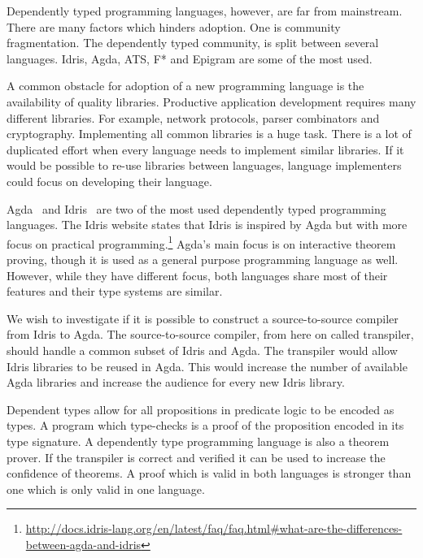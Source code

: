 \documentclass[parskip=half]{scrartcl}
\begin{document}
Dependently typed programming languages, however, are far from mainstream.
There are many factors which hinders adoption. One is community fragmentation.
The dependently typed community, is split between several languages.
Idris, Agda, ATS, F* and Epigram are some of the most used.

A common obstacle for adoption of a new programming language is the
availability of quality libraries. Productive application development requires
many different libraries.  For example, network protocols, parser combinators
and cryptography.  Implementing all common libraries is a huge task.  There is
a lot of duplicated effort when every language needs to implement similar
libraries.  If it would be possible to re-use libraries between languages,
language implementers could focus on developing their language.

Agda~\cite{agda} and Idris~\cite{idris} are two of the most used dependently
typed programming languages.
The Idris website states that Idris is inspired
by Agda but with more focus on practical
programming.\footnote{\url{http://docs.idris-lang.org/en/latest/faq/faq.html\#what-are-the-differences-between-agda-and-idris}}
Agda's main focus is on interactive theorem proving, though it is used as
a general purpose programming language as well.
However, while they have different focus, both languages share most of their features and their type systems are similar.

We wish to investigate if it is possible to construct a source-to-source
compiler from Idris to Agda. The source-to-source compiler, from here on called
transpiler, should handle a common subset of Idris and Agda.  The transpiler
would allow Idris libraries to be reused in Agda. This would increase the
number of available Agda libraries and increase the audience for every new
Idris library.

Dependent types allow for all propositions in predicate logic to be encoded as
types. A program which type-checks is a proof of the proposition encoded in
its type signature. A dependently type programming language is also a theorem
prover. If the transpiler is correct and verified it can be used to increase
the confidence of theorems. A proof which is valid in both languages is
stronger than one which is only valid in one language.
\end{document}
